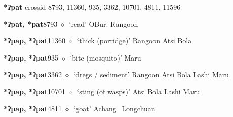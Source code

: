 \item
\textbf{*ʔpat}
  {\tiny crossid 8793, 11360, 935, 3362, 10701, 4811, 11596}
  \begin{list}{}{\leftmargin=1.5em \itemindent=-1.5em}
  \item {\footnotesize \textbf{*ʔpat, *pat}}{\tiny 8793}
         $\diamond$~`read'
         OBur. 
\hspace{1ex}
         Rangoon 
  \item {\footnotesize \textbf{*ʔpap, *ʔpat}}{\tiny 11360}
\hspace{1ex}
         $\diamond$~`thick (porridge)'
         Rangoon 
\hspace{1ex}
         Atsi 
\hspace{1ex}
         Bola 
  \item {\footnotesize \textbf{*ʔpap, *ʔpat}}{\tiny 935}
\hspace{1ex}
         $\diamond$~`bite (mosquito)'
         Maru 
  \item {\footnotesize \textbf{*ʔpap, *ʔpat}}{\tiny 3362}
\hspace{1ex}
         $\diamond$~`dregs / sediment'
         Rangoon 
\hspace{1ex}
         Atsi 
\hspace{1ex}
         Bola 
\hspace{1ex}
         Lashi 
\hspace{1ex}
         Maru 
  \item {\footnotesize \textbf{*ʔpap, *ʔpat}}{\tiny 10701}
\hspace{1ex}
         $\diamond$~`sting (of wasps)'
         Atsi 
\hspace{1ex}
         Bola 
\hspace{1ex}
         Lashi 
\hspace{1ex}
         Maru 
  \item {\footnotesize \textbf{*ʔpap, *ʔpat}}{\tiny 4811}
\hspace{1ex}
         $\diamond$~`goat'
         Achang\_Longchuan 

\end{list}
